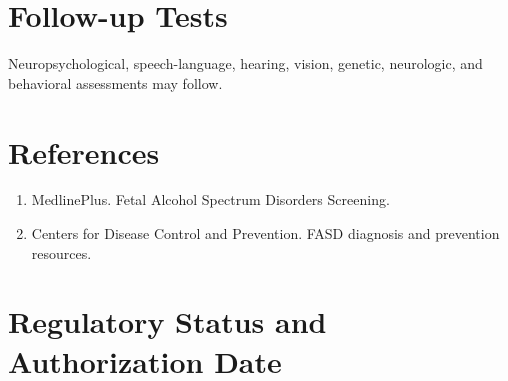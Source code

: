 \section*{Follow-up Tests} Neuropsychological, speech-language, hearing, vision, genetic, neurologic, and behavioral assessments may follow.
\section*{References} \begin{enumerate}\item MedlinePlus. Fetal Alcohol Spectrum Disorders Screening.\item Centers for Disease Control and Prevention. FASD diagnosis and prevention resources.\end{enumerate}
\clearpage\section*{Regulatory Status and Authorization Date}\clearpage
